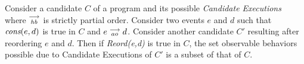 \begin{theorem} 

    Consider a candidate $C$ of a program and its possible \textit{Candidate Executions} where $\stackrel{\longrightarrow}{_\textit{hb}}$ is strictly partial order. Consider two events $e$ and $d$ such that $\textit{cons}(e,d)$ is true in $C$ and  $e\stackrel{\longrightarrow}{_{ao}}d$. Consider another candidate $C'$ resulting after reordering $e$ and $d$. 
    Then if \emph{Reord(e,d)} is true in $C$, the set observable behaviors possible due to Candidate Executions of $C'$ is a subset of that of $C$. 
\end{theorem}
